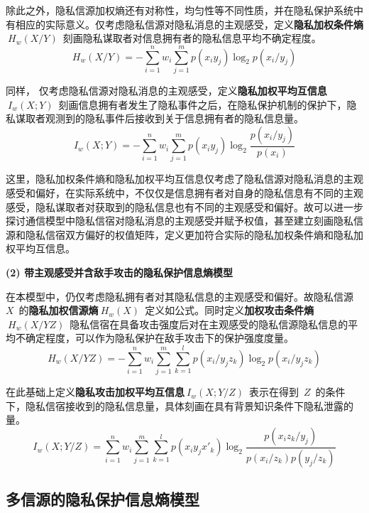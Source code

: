 除此之外，隐私信源加权熵还有对称性，均匀性等不同性质，并在隐私保护系统中有相应的实际意义。仅考虑隐私信源对隐私消息的主观感受，定义\textbf{隐私加权条件熵}$~H_{w}(X/Y)$~刻画隐私谋取者对信息拥有者的隐私信息平均不确定程度。
\begin{equation}
H_{w}(X/Y)=-\sum_{i=1}^{n}w_{i}\sum_{j=1}^{m}p(x_{i}y_{j})\log_{2}p(x_{i}/y_{j})
\end{equation}

同样， 仅考虑隐私信源对隐私消息的主观感受，定义\textbf{隐私加权平均互信息}$~I_{w}(X;Y)$~刻画信息拥有者发生了隐私事件之后，在隐私保护机制的保护下，隐私谋取者观测到的隐私事件后接收到关于信息拥有者的隐私信息量。
\begin{equation}
I_{w}(X;Y)=-\sum_{i=1}^{n}w_{i}\sum_{j=1}^{m}p(x_{i}y_{j})\log_{2}\frac{p(x_{i}/y_{j})}{p(x_{i})}
\end{equation}

这里，隐私加权条件熵和隐私加权平均互信息仅考虑了隐私信源对隐私消息的主观感受和偏好，在实际系统中，不仅仅是信息拥有者对自身的隐私信息有不同的主观感受，隐私谋取者对获取到的隐私信息也有不同的主观感受和偏好。故可以进一步探讨通信模型中隐私信宿对隐私消息的主观感受并赋予权值，甚至建立刻画隐私信源和隐私信宿双方偏好的权值矩阵，定义更加符合实际的隐私加权条件熵和隐私加权平均互信息。

\textbf{(2) 带主观感受并含敌手攻击的隐私保护信息熵模型}

在本模型中，仍仅考虑隐私拥有者对其隐私信息的主观感受和偏好。故隐私信源~$X$~的\textbf{隐私加权信源熵}$~H_{w}(X)$~定义如公式。同时定义\textbf{加权攻击条件熵}$~H_{w}(X/YZ)$~隐私信宿在具备攻击强度后对在主观感受的隐私信源隐私信息的平均不确定程度，可以作为隐私保护在敌手攻击下的保护强度度量。
\begin{equation}
H_{w}(X/YZ)=-\sum_{i=1}^{n}w_{i}\sum_{j=1}^{m}\sum_{k=1}^{l}p(x_{i}/y_{j}z_{k})\log_{2}p(x_{i}/y_{j}z_{k})
\end{equation}

在此基础上定义\textbf{隐私攻击加权平均互信息}$~I_w(X;Y/Z)$~表示在得到~$Z$~的条件下，隐私信宿接收到的隐私信息量，具体刻画在具有背景知识条件下隐私泄露的量。
\begin{equation}
I_w(X;Y/Z)=\sum_{i=1}^{n}w_{i}\sum_{j=1}^{m}\sum_{k=1}^{l}p(x_{i}y_{j}{x}'_{k})\log_{2}\frac{p(x_{i}z_{k}/y_{j})}{p(x_{i}/z_{k})p(y_{j}/z_{k})}
\end{equation}

\subsection{多信源的隐私保护信息熵模型}

